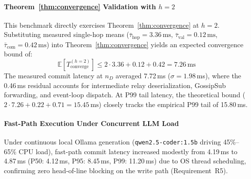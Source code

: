 \paragraph{Theorem~\ref{thm:convergence} Validation with $h=2$}
This benchmark directly exercises Theorem~\ref{thm:convergence} at $h=2$. Substituting measured single-hop means ($\bar{\tau}_{\text{hop}} = 3.36\,\text{ms}$, $\bar{\tau}_{\text{val}} = 0.12\,\text{ms}$, $\bar{\tau}_{\text{com}} = 0.42\,\text{ms}$) into Theorem~\ref{thm:convergence} yields an expected convergence bound of:
\[
\mathbb{E}[T_{\text{converge}}^{(h=2)}] \leq 2 \cdot 3.36 + 0.12 + 0.42 = 7.26\,\text{ms}
\]
The measured commit latency at $n_D$ averaged 7.72\,ms ($\sigma = 1.98$\,ms), where the 0.46\,ms residual accounts for intermediate relay deserialization, GossipSub forwarding, and event-loop dispatch. At P99 tail latency, the theoretical bound ($2 \cdot 7.26 + 0.22 + 0.71 = 15.45\,\text{ms}$) closely tracks the empirical P99 tail of 15.80\,ms.

\paragraph{Fast-Path Execution Under Concurrent LLM Load}
Under continuous local Ollama generation (\texttt{qwen2.5-coder:1.5b} driving 45\%--65\% CPU load), fast-path commit latency increased modestly from 4.19\,ms to 4.87\,ms (P50: 4.12\,ms, P95: 8.45\,ms, P99: 11.20\,ms) due to OS thread scheduling, confirming zero head-of-line blocking on the write path (Requirement~R5).

